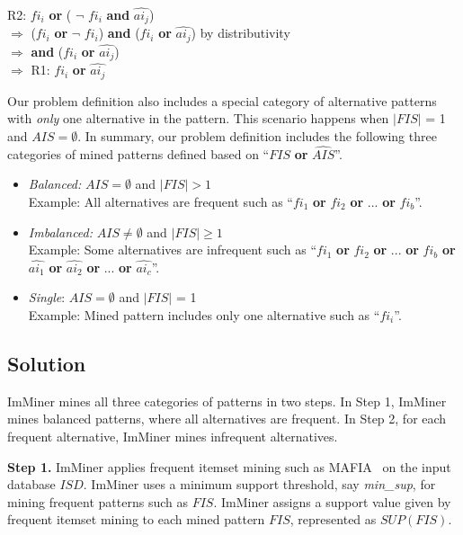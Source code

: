 R2: $fi_i$ \textbf{or} ( $\neg$ $fi_i$ \textbf{and} $\hat{ai_j}$)\\
$\Rightarrow$ ($fi_i$ \textbf{or} $\neg$ $fi_i$) \textbf{and} ($fi_i$ \textbf{or} $\hat{ai_j}$) by distributivity\\
$\Rightarrow$  \textbf{and} ($fi_i$ \textbf{or} $\hat{ai_j}$)\\
$\Rightarrow$ R1: $fi_i$ \textbf{or} $\hat{ai_j}$

Our problem definition also includes a special category of alternative patterns with \emph{only} one alternative in the pattern. This scenario happens when $| FIS |$ = 1 and $AIS = \emptyset$. In summary, our problem definition includes the following three categories of mined patterns defined based on ``$FIS$ \textbf{or} $\hat{AIS}$''.

\begin{itemize}
\item \emph{Balanced:} $AIS = \emptyset$ and $| FIS | > 1$ \\
Example: All alternatives are frequent such as ``$fi_1$ \textbf{or} $fi_2$ \textbf{or} ... \textbf{or} $fi_b$''.
\item \emph{Imbalanced:} $AIS \neq \emptyset$ and $| FIS | \geq 1$ \\
Example: Some alternatives are infrequent such as ``$fi_1$ \textbf{or} $fi_2$ \textbf{or} ... \textbf{or} $fi_b$ \textbf{or} $\hat{ai_1}$ \textbf{or} $\hat{ai_2}$ \textbf{or} ... \textbf{or} $\hat{ai_c}$''.
\item \emph{Single}: $AIS = \emptyset$ and $| FIS |$ = 1\\ Example: Mined pattern includes only one alternative such as ``$fi_i$''.
\end{itemize}

\subsection{Solution}

ImMiner mines all three categories of patterns in two steps. In Step 1, ImMiner 
mines balanced patterns, where all alternatives are frequent. In Step 2,
for each frequent alternative, ImMiner mines infrequent alternatives.

\textbf{Step 1.} ImMiner applies frequent itemset mining such as MAFIA~\cite{Burdick01mafia} on the input database $ISD$.
ImMiner uses a minimum support threshold, say \emph{min\_sup}, for
mining frequent patterns such as $FIS$. ImMiner assigns a support value
given by frequent itemset mining to each mined pattern $FIS$, represented as $SUP(FIS)$.

